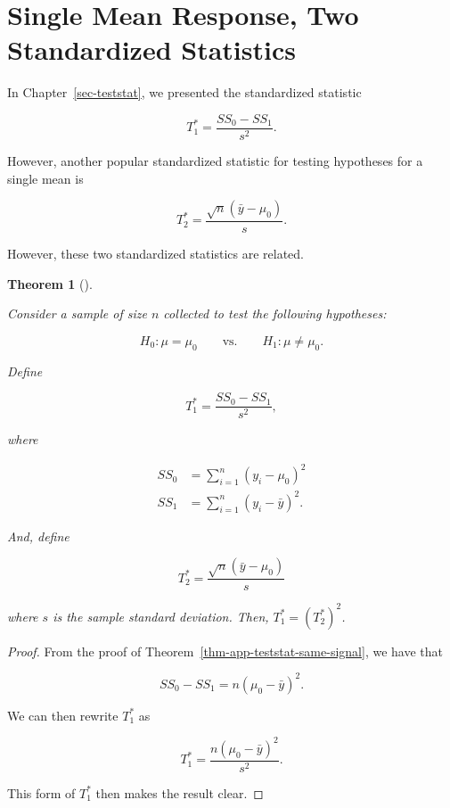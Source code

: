 \documentclass[
  letterpaper,
  DIV=11,
  numbers=noendperiod]{scrreprt}
\theoremstyle{plain}
\newtheorem{theorem}{Theorem}[chapter]
\theoremstyle{definition}
\theoremstyle{definition}
\theoremstyle{remark}
\begin{document}
\section{Single Mean Response, Two Standardized
Statistics}\label{single-mean-response-two-standardized-statistics}

In Chapter~\ref{sec-teststat}, we presented the standardized statistic

\[T_1^* = \frac{SS_0 - SS_1}{s^2}.\]

However, another popular standardized statistic for testing hypotheses
for a single mean is

\[T_2^* = \frac{\sqrt{n} \left(\bar{y} - \mu_0\right)}{s}.\]

However, these two standardized statistics are related.

\begin{theorem}[]\protect\hypertarget{thm-app-teststat-two-statistics}{}\label{thm-app-teststat-two-statistics}

Consider a sample of size \(n\) collected to test the following
hypotheses:

\[H_0: \mu = \mu_0 \qquad \text{vs.} \qquad H_1: \mu \neq \mu_0.\]

Define

\[T_1^* = \frac{SS_0 - SS_1}{s^2},\]

where

\[
\begin{aligned}
  SS_0 &= \sum_{i=1}^{n} \left(y_i - \mu_0\right)^2 \\
  SS_1 &= \sum_{i=1}^{n} \left(y_i - \bar{y}\right)^2.
\end{aligned}
\]

And, define

\[T_2^* = \frac{\sqrt{n} \left(\bar{y} - \mu_0\right)}{s}\]

where \(s\) is the sample standard deviation. Then,
\(T_1^* = \left(T_2^*\right)^2\).

\end{theorem}

\begin{proof}
From the proof of Theorem~\ref{thm-app-teststat-same-signal}, we have
that

\[SS_0 - SS_1 = n \left(\mu_0 - \bar{y}\right)^2.\]

We can then rewrite \(T_1^*\) as

\[T_1^* = \frac{n\left(\mu_0 - \bar{y}\right)^2}{s^2}.\]

This form of \(T_1^*\) then makes the result clear.
\end{proof}
\end{document}

